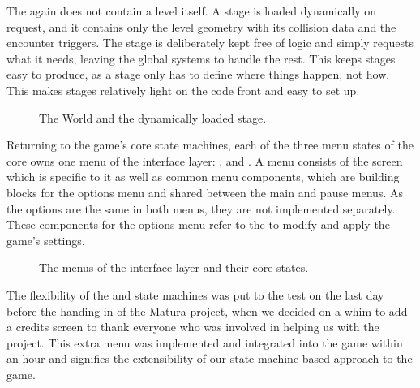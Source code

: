 \documentclass[../Main.tex]{subfiles}
\begin{document}
The  again does not contain a level itself. A stage is loaded dynamically on request, and it contains only the level geometry with its collision data and the encounter triggers. The stage is deliberately kept free of logic and simply requests what it needs, leaving the global systems to handle the rest. This keeps stages easy to produce, as a stage only has to define where things happen, not how. This makes stages relatively light on the code front and easy to set up.

\begin{figure}[H]
    \centering
    
    \caption[The World and the dynamically loaded stage. Own figure.]{The World and the dynamically loaded stage.}
    \label{fig:stage-loading}
\end{figure}

Returning to the game's core state machines, each of the three menu states of the core owns one menu of the interface layer: ,  and . A menu consists of the screen which is specific to it as well as common menu components, which are building blocks for the options menu and shared between the main and pause menus. As the options are the same in both menus, they are not implemented separately. These components for the options menu refer to the  to modify and apply the game's settings.

\begin{figure}[H]
    \centering
    
    \caption[The menus of the interface layer and their core states. Own figure.]{The menus of the interface layer and their core states.}
    \label{fig:interface-layer}
\end{figure}

The flexibility of the  and  state machines was put to the test on the last day before the handing-in of the Matura project, when we decided on a whim to add a credits screen to thank everyone who was involved in helping us with the project. This extra menu was implemented and integrated into the game within an hour and signifies the extensibility of our state-machine-based approach to the game.

\subsection{}\label{sec:gameobjectmanager}
\end{document}
